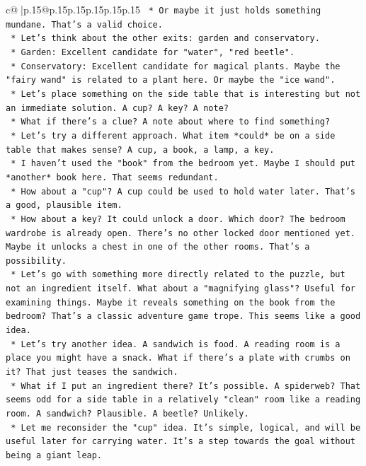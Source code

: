 \documentclass{article}
\begin{document}
{\begin{supertabular}{c@{$\;$}|p{.15\linewidth}@{}p{.15\linewidth}p{.15\linewidth}p{.15\linewidth}p{.15\linewidth}p{.15\linewidth}}
{{{\texttt{    *   Or maybe it just holds something mundane. That's a valid choice.} \\
\texttt{    *   Let's think about the other exits: garden and conservatory.} \\
\texttt{        *   Garden: Excellent candidate for "water", "red beetle".} \\
\texttt{        *   Conservatory: Excellent candidate for magical plants. Maybe the "fairy wand" is related to a plant here. Or maybe the "ice wand".} \\
\texttt{    *   Let's place something on the side table that is interesting but not an immediate solution. A cup? A key? A note?} \\
\texttt{    *   What if there's a clue? A note about where to find something?} \\
\texttt{    *   Let's try a different approach. What item *could* be on a side table that makes sense? A cup, a book, a lamp, a key.} \\
\texttt{    *   I haven't used the "book" from the bedroom yet. Maybe I should put *another* book here. That seems redundant.} \\
\texttt{    *   How about a "cup"? A cup could be used to hold water later. That's a good, plausible item.} \\
\texttt{    *   How about a key? It could unlock a door. Which door? The bedroom wardrobe is already open. There's no other locked door mentioned yet. Maybe it unlocks a chest in one of the other rooms. That's a possibility.} \\
\texttt{    *   Let's go with something more directly related to the puzzle, but not an ingredient itself. What about a "magnifying glass"? Useful for examining things. Maybe it reveals something on the book from the bedroom? That's a classic adventure game trope. This seems like a good idea.} \\
\texttt{    *   Let's try another idea. A sandwich is food. A reading room is a place you might have a snack. What if there's a plate with crumbs on it? That just teases the sandwich.} \\
\texttt{    *   What if I put an ingredient there? It's possible. A spiderweb? That seems odd for a side table in a relatively "clean" room like a reading room. A sandwich? Plausible. A beetle? Unlikely.} \\
\texttt{    *   Let me reconsider the "cup" idea. It's simple, logical, and will be useful later for carrying water. It's a step towards the goal without being a giant leap.} \\
}}}
\end{supertabular}}
\end{document}
